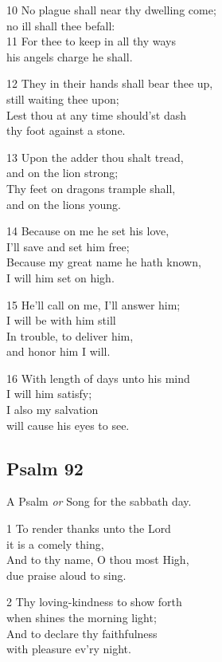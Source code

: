 10 No plague shall near thy dwelling come;\\
no ill shall thee befall:\\
11 For thee to keep in all thy ways\\
his angels charge he shall.

12 They in their hands shall bear thee up,\\
still waiting thee upon;\\
Lest thou at any time should’st dash\\
thy foot against a stone.

13 Upon the adder thou shalt tread,\\
and on the lion strong;\\
Thy feet on dragons trample shall,\\
and on the lions young.

14 Because on me he set his love,\\
I’ll save and set him free;\\
Because my great name he hath known,\\
I will him set on high.

15 He’ll call on me, I’ll answer him;\\
I will be with him still\\
In trouble, to deliver him,\\
and honor him I will.

16 With length of days unto his mind\\
I will him satisfy;\\
I also my salvation\\
will cause his eyes to see.

\begin{center}
\quad{}\quad{}
\end{center}

\subsection*{Psalm 92}

A Psalm \emph{or} Song for the sabbath day.

1 To render thanks unto the Lord\\
it is a comely thing,\\
And to thy name, O thou most High,\\
due praise aloud to sing.

2 Thy loving-kindness to show forth\\
when shines the morning light;\\
And to declare thy faithfulness\\
with pleasure ev’ry night.

